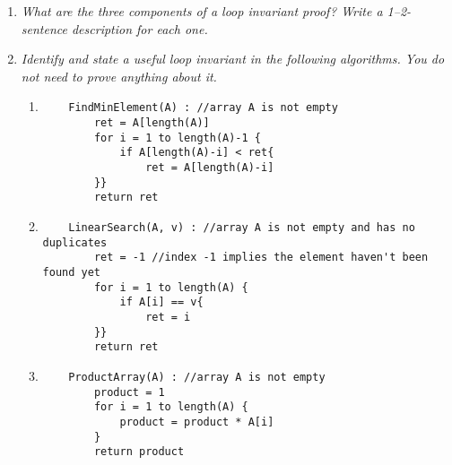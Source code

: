 \documentclass[12pt]{article}
\begin{document}
\hrulefill

\begin{enumerate}

\item	\label{1} {\itshape What are the three components of a loop invariant proof? Write a 1--2-sentence description for each one.}\\


\pagebreak

\item {\itshape Identify and state a useful loop invariant in the following algorithms. You \emph{do not} need to prove anything about it.}
\begin{enumerate}
\item \label{2a} 
	\begin{small}
	\begin{verbatim}
	FindMinElement(A) : //array A is not empty
	    ret = A[length(A)]
	    for i = 1 to length(A)-1 {
	        if A[length(A)-i] < ret{
	            ret = A[length(A)-i]	           
	    }}
	    return ret
	\end{verbatim}
	\end{small}


\pagebreak

\item \label{2b} 
	\begin{small}
	\begin{verbatim}
	LinearSearch(A, v) : //array A is not empty and has no duplicates 
	    ret = -1 //index -1 implies the element haven't been found yet
	    for i = 1 to length(A) {
	        if A[i] == v{
	            ret = i	           
	    }}
	    return ret
	\end{verbatim}
	\end{small}


\pagebreak

\vspace{4mm}

\item \label{2c}
    \begin{small}
	\begin{verbatim}
	ProductArray(A) : //array A is not empty
	    product = 1
	    for i = 1 to length(A) {
	        product = product * A[i]    
	    }
	    return product
	\end{verbatim}
	\end{small}
\end{enumerate}


\end{enumerate}
\end{document}
